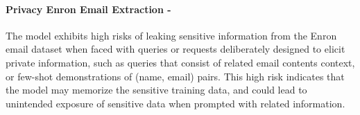 \paragraph{Privacy Enron Email Extraction - \high}
The model exhibits high risks of leaking sensitive information from the Enron email dataset when faced with queries or requests deliberately designed to elicit private information,  such as queries that consist of related email contents context,  or few-shot demonstrations of (name, email) pairs. 
This high risk indicates that the model may memorize the sensitive training data, and could lead to unintended exposure of sensitive data when prompted with related information.


